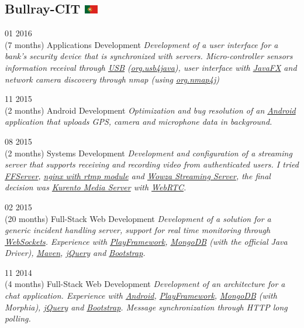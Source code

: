 \documentclass[]{friggeri-cv}
\begin{document}
	\subsection{Bullray-CIT \includegraphics[width=16pt]{pt}}  
		\begin{entrylist}
			\entry
			{01 2016\\(7 months)}
			{Applications Development}
			{}			
			{\emph{Development of a user interface for a bank's security device that is synchronized with servers. Micro-controller sensors information receival through \underline{USB} (\underline{org.usb4java}), user interface with \underline{JavaFX} and network camera discovery through nmap (using \underline{org.nmap4j}) } }

			\entry
			{11 2015\\(2 months)}
			{Android Development}
			{}
			{\emph{Optimization and bug resolution of an \underline{Android} application that uploads GPS, camera and microphone data in background.}}


			\entry
			{08 2015\\(2 months)}
			{Systems Development}
			{}
			{\emph{Development and configuration of a streaming server that supports receiving and recording video from authenticated users. I tried \underline{FFServer}, \underline{nginx with rtmp module} and \underline{Wowza Streaming Server}, the final decision was \underline{Kurento Media Server} with \underline{WebRTC}. }}

			\entry
			{02 2015\\(20 months)}
			{Full-Stack Web Development}
			{}
			{\emph{Development of a solution for a generic incident handling server, support for real time monitoring through \underline{WebSockets}. Experience with \underline{PlayFramework}, \underline{MongoDB} (with the official Java Driver), \underline{Maven}, \underline{jQuery} and \underline{Bootstrap}.}}

			\entry
			{11 2014\\(4 months)}
			{Full-Stack Web Development}
			{}
			{\emph{Development of an architecture for a chat application. Experience with \underline{Android}, \underline{PlayFramework}, \underline{MongoDB} (with Morphia), \underline{jQuery} and \underline{Bootstrap}. Message synchronization through HTTP long polling.}}
			
	
		\end{entrylist}
\newpage
\end{document}
